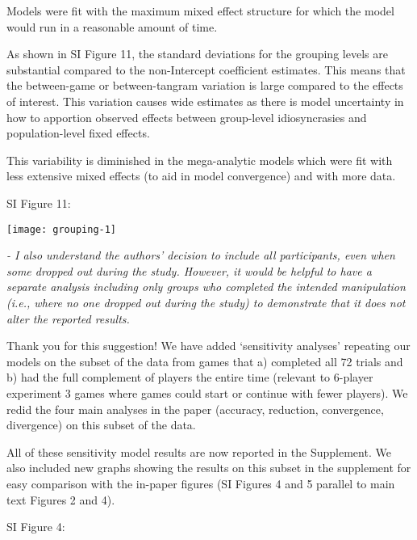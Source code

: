 \documentclass{stanfordletter}
\newcommand{\theysaid}[1]{\begin{leftbar} \noindent 
		\textsl{ #1}\end{leftbar}}
\begin{document}
\begin{letter}{}
{   
          	
          	Models were fit with the maximum mixed effect structure for which the model would run in a reasonable amount of time. 
          	
          	As shown in SI Figure 11, the standard deviations for the grouping levels are substantial compared to the non-Intercept coefficient estimates. This means that the between-game or between-tangram variation is large compared to the effects of interest. This variation causes wide estimates as there is model uncertainty in how to apportion observed effects between group-level idiosyncrasies and population-level fixed effects.
          	
          	This variability is diminished in the mega-analytic models which were fit with less extensive mixed effects (to aid in model convergence) and with more data. }

          SI Figure 11: 
          
                    	{\begin{center} \texttt{[image: grouping-1]}\end{center}}
          

          
          \theysaid{- I also understand the authors' decision to include all participants, even when some dropped out during the study. However, it would be helpful to have a separate analysis including only groups who completed the intended manipulation (i.e., where no one dropped out during the study) to demonstrate that it does not alter the reported results.}
          
          Thank you for this suggestion! We have added `sensitivity analyses' repeating our models on the subset of the data from games that a) completed all 72 trials and b) had the full complement of players the entire time (relevant to 6-player experiment 3 games where games could start or continue with fewer players). We redid the four main analyses in the paper (accuracy, reduction, convergence, divergence) on this subset of the data. 
          
          All of these sensitivity model results are now reported in the Supplement. We also included new graphs showing the results on this subset in the supplement for easy comparison with the in-paper figures (SI Figures 4 and 5 parallel to main text Figures 2 and 4). 
          
          SI Figure 4:
          

\end{letter}
\end{document}
